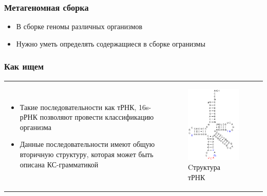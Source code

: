 \documentclass{beamer}
\begin{document}
 \begin{frame}
     \frametitle{Метагеномная сборка}
     \begin{itemize}
         \item В сборке геномы различных организмов
         \item Нужно уметь определять содержащиеся в сборке огранизмы
     \end{itemize}
 \end{frame}
 
 \begin{frame}
     \frametitle{Как ищем}
     \begin{tabular}{p{6cm} p{5cm}}
         \begin{itemize}
             \item Такие последовательности как тРНК, 16s-рРНК позволяют провести классификацию организма
             \item Данные последовательности имеют общую вторичную структуру, которая может быть описана КС-грамматикой
         \end{itemize}
         &
         \vspace{-1cm}
         \begin{figure}[b]
             \centering
             \includegraphics[width=5.2cm]{pictures/TRNA.png}
             \caption{Cтруктура тРНК}
         \end{figure}
     \end{tabular}  
 \end{frame}
 
\end{document}

